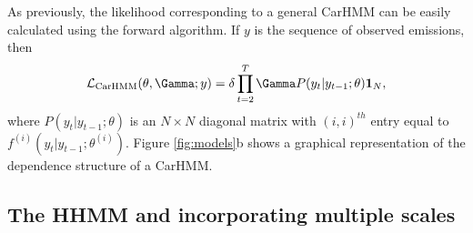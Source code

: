 As previously, the likelihood corresponding to a general CarHMM can be easily calculated using the forward algorithm. If $y$ is the sequence of observed emissions, then
\begin{equation*}
    \calL_{\text{CarHMM}}(\theta,\Gamma;y) = \delta \prod_{t=2}^T \Gamma P(y_t|y_{t-1};\theta) \mathbf{1}_N,
    \label{eqn:CarHMM_likelihood}
\end{equation*}
where
%
$P(y_t|y_{t-1};\theta)$ is an $N \times N$ diagonal matrix with $(i,i)^{th}$ entry equal to $f^{(i)}(y_t|y_{t-1}; \theta^{(i)})$. Figure \ref{fig:models}b shows a graphical representation of the dependence structure of a CarHMM. 

\subsection{The HHMM and incorporating multiple scales}

